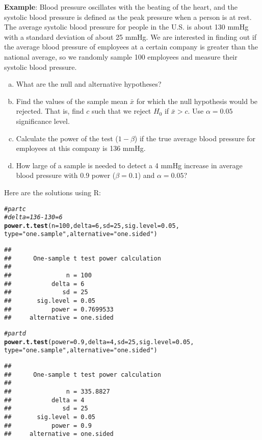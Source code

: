 \documentclass[12pt, fleqn]{article}\usepackage[]{graphicx}\usepackage[]{color}
\makeatletter
\newcommand{\hlnum}[1]{\textcolor[rgb]{0.686,0.059,0.569}{#1}}%
\newcommand{\hlstr}[1]{\textcolor[rgb]{0.192,0.494,0.8}{#1}}%
\newcommand{\hlcom}[1]{\textcolor[rgb]{0.678,0.584,0.686}{\textit{#1}}}%
\newcommand{\hlstd}[1]{\textcolor[rgb]{0.345,0.345,0.345}{#1}}%
\newcommand{\hlkwc}[1]{\textcolor[rgb]{0.333,0.667,0.333}{#1}}%
\newcommand{\hlkwd}[1]{\textcolor[rgb]{0.737,0.353,0.396}{\textbf{#1}}}%
\newenvironment{kframe}{%
 \def\at@end@of@kframe{}%
 \ifinner\ifhmode%
  \def\at@end@of@kframe{\end{minipage}}%
  \begin{minipage}{\columnwidth}%
 \fi\fi%
 \def\FrameCommand##1{\hskip\@totalleftmargin \hskip-\fboxsep
 \colorbox{shadecolor}{##1}\hskip-\fboxsep
     \hskip-\linewidth \hskip-\@totalleftmargin \hskip\columnwidth}%
 \MakeFramed {\advance\hsize-\width
   \@totalleftmargin\z@ \linewidth\hsize
   \@setminipage}}%
 {\par\unskip\endMakeFramed%
 \at@end@of@kframe}
\newenvironment{knitrout}{}{} %
\makeatother
\begin{document}
\textbf{Example}:  Blood pressure oscillates with the beating of the heart, and the systolic blood pressure is defined as the peak pressure when a person is at rest.  The average systolic blood pressure for people in the U.S. is about 130 mmHg with a standard deviation of about 25 mmHg.  We are interested in finding out if the average blood pressure of employees at a certain company is greater than the national average, so we randomly sample 100 employees and measure their systolic blood pressure.
\begin{enumerate}[(a)]
\item What are the null and alternative hypotheses?
\item Find the values of the sample mean $\bar{x}$ for which the null hypothesis would be rejected.  That is, find $c$ such that we reject $H_0$ if $\bar{x} > c$. Use $\alpha = 0.05$ significance level. 
\item Calculate the power of the test ($1-\beta$) if the true average blood pressure for employees at this company is 136 mmHg.
\item How large of a sample is needed to detect a 4 mmHg increase in average blood pressure with 0.9 power ($\beta=0.1$) and $\alpha = 0.05$?
\end{enumerate}
\clearpage

Here are the solutions using R:
\begin{knitrout}
\color{fgcolor}\begin{kframe}
\begin{alltt}
\hlcom{# part c}
\hlcom{# delta = 136-130 = 6}
\hlkwd{power.t.test}\hlstd{(}\hlkwc{n}\hlstd{=}\hlnum{100}\hlstd{,} \hlkwc{delta}\hlstd{=}\hlnum{6}\hlstd{,} \hlkwc{sd}\hlstd{=}\hlnum{25}\hlstd{,} \hlkwc{sig.level}\hlstd{=}\hlnum{0.05}\hlstd{,}
  \hlkwc{type}\hlstd{=}\hlstr{"one.sample"}\hlstd{,} \hlkwc{alternative}\hlstd{=}\hlstr{"one.sided"}\hlstd{)}
\end{alltt}
\begin{verbatim}
## 
##      One-sample t test power calculation 
## 
##               n = 100
##           delta = 6
##              sd = 25
##       sig.level = 0.05
##           power = 0.7699533
##     alternative = one.sided
\end{verbatim}
\begin{alltt}
\hlcom{# part d}
\hlkwd{power.t.test}\hlstd{(}\hlkwc{power}\hlstd{=}\hlnum{0.9}\hlstd{,} \hlkwc{delta}\hlstd{=}\hlnum{4}\hlstd{,} \hlkwc{sd}\hlstd{=}\hlnum{25}\hlstd{,} \hlkwc{sig.level}\hlstd{=}\hlnum{0.05}\hlstd{,}
  \hlkwc{type}\hlstd{=}\hlstr{"one.sample"}\hlstd{,} \hlkwc{alternative} \hlstd{=} \hlstr{"one.sided"}\hlstd{)}
\end{alltt}
\begin{verbatim}
## 
##      One-sample t test power calculation 
## 
##               n = 335.8827
##           delta = 4
##              sd = 25
##       sig.level = 0.05
##           power = 0.9
##     alternative = one.sided
\end{verbatim}
\end{kframe}
\end{knitrout}
\end{document}
